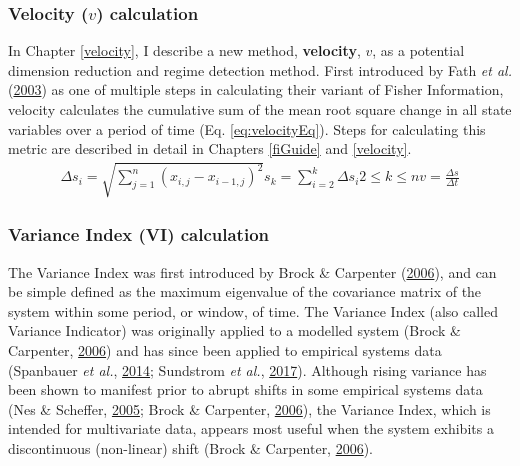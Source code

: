 \documentclass[12pt,twoside,openany]{reedthesis}
\begin{document}
\hypertarget{velocity-v-calculation}{%
\subsubsection{\texorpdfstring{Velocity (\(v\)) calculation}{Velocity (v) calculation}}\label{velocity-v-calculation}}

In Chapter \ref{velocity}, I describe a new method, \textbf{velocity}, \(v\), as a potential dimension reduction and regime detection method. First introduced by Fath \emph{et al.} (\protect\hyperlink{ref-fath_regime_2003}{2003}) as one of multiple steps in calculating their variant of Fisher Information, velocity calculates the cumulative sum of the mean root square change in all state variables over a period of time (Eq. \eqref{eq:velocityEq}). Steps for calculating this metric are described in detail in Chapters \ref{fiGuide} and \ref{velocity}.
\begin{equation}
\begin{array}{rcr}
\Delta s_i = \sqrt{\sum_{j=1}^{n} (x_{i,j} -x_{i-1, j})^2}
s_k =  \sum_{i=2}^{k}\Delta{s_i}
2\leq k \leq n
v =\frac{\Delta s}{\Delta t}  
\end{array}
\label{eq:velocityEq}
\end{equation}
\hypertarget{variance-index-vi-calculation}{%
\subsubsection{Variance Index (VI) calculation}\label{variance-index-vi-calculation}}

The Variance Index was first introduced by Brock \& Carpenter (\protect\hyperlink{ref-brock_variance_2006}{2006}), and can be simple defined as the maximum eigenvalue of the covariance matrix of the system within some period, or window, of time. The Variance Index (also called Variance Indicator) was originally applied to a modelled system (Brock \& Carpenter, \protect\hyperlink{ref-brock_variance_2006}{2006}) and has since been applied to empirical systems data (Spanbauer \emph{et al.}, \protect\hyperlink{ref-spanbauer_prolonged_2014}{2014}; Sundstrom \emph{et al.}, \protect\hyperlink{ref-sundstrom2017detecting}{2017}). Although rising variance has been shown to manifest prior to abrupt shifts in some empirical systems data (Nes \& Scheffer, \protect\hyperlink{ref-van2005implications}{2005}; Brock \& Carpenter, \protect\hyperlink{ref-brock_variance_2006}{2006}), the Variance Index, which is intended for multivariate data, appears most useful when the system exhibits a discontinuous (non-linear) shift (Brock \& Carpenter, \protect\hyperlink{ref-brock_variance_2006}{2006}).
\end{document}
